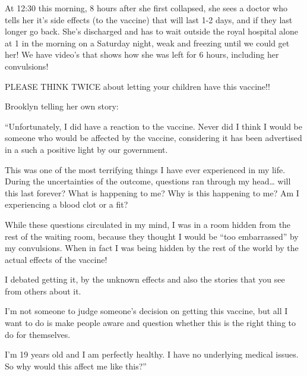 At 12:30 this morning, 8 hours after she first collapsed, she sees a doctor who
tells her it’s side effects (to the vaccine) that will last 1-2 days, and if
they last longer go back. She’s discharged and has to wait outside the royal
hospital alone at 1 in the morning on a Saturday night, weak and freezing until
we could get her! We have video’s that shows how she was left for 6 hours,
including her convulsions!

PLEASE THINK TWICE about letting your children have this vaccine!!

Brooklyn telling her own story:

“Unfortunately, I did have a reaction to the vaccine. Never did I think I would
be someone who would be affected by the vaccine, considering it has been
advertised in a such a positive light by our government.

This was one of the most terrifying things I have ever experienced in my
life. During the uncertainties of the outcome, questions ran through my head…
will this last forever? What is happening to me? Why is this happening to me? Am
I experiencing a blood clot or a fit?

While these questions circulated in my mind, I was in a room hidden from the
rest of the waiting room, because they thought I would be “too embarrassed” by
my convulsions. When in fact I was being hidden by the rest of the world by the
actual effects of the vaccine!

I debated getting it, by the unknown effects and also the stories that you see
from others about it.

I’m not someone to judge someone’s decision on getting this vaccine, but all I
want to do is make people aware and question whether this is the right thing to
do for themselves.

I’m 19 years old and I am perfectly healthy. I have no underlying medical
issues. So why would this affect me like this?”


